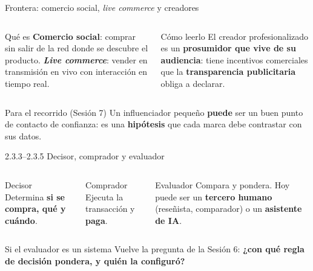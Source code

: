\documentclass[aspectratio=169,xcolor=dvipsnames]{beamer}
\begin{document}
\begin{frame}{Frontera: comercio social, \textit{live commerce} y creadores}
\begin{columns}[T]
  \begin{block}{Qué es}
    \small \textbf{Comercio social}: comprar sin salir de la red donde se descubre el producto. \textbf{\textit{Live commerce}}: vender en transmisión en vivo con interacción en tiempo real.
  \end{block}
  \begin{alertblock}{Cómo leerlo}
    \small El creador profesionalizado es un \textbf{prosumidor que vive de su audiencia}: tiene incentivos comerciales que la \textbf{transparencia publicitaria} obliga a declarar.
  \end{alertblock}
\end{columns}
\vspace{6pt}
\begin{exampleblock}{Para el recorrido (Sesión 7)}
  \small Un influenciador pequeño \textbf{puede} ser un buen punto de contacto de confianza: es una \textbf{hipótesis} que cada marca debe contrastar con sus datos.
\end{exampleblock}
\end{frame}

\begin{frame}{2.3.3--2.3.5 Decisor, comprador y evaluador}
\begin{columns}[T]
  \begin{block}{Decisor}
    \small Determina \textbf{si se compra, qué y cuándo}.
  \end{block}
  \begin{block}{Comprador}
    \small Ejecuta la transacción y \textbf{paga}.
  \end{block}
  \begin{alertblock}{Evaluador}
    \small Compara y pondera. Hoy puede ser un \textbf{tercero humano} (reseñista, comparador) o un \textbf{asistente de IA}.
  \end{alertblock}
\end{columns}
\vspace{6pt}
\begin{block}{Si el evaluador es un sistema}
  \small Vuelve la pregunta de la Sesión 6: \textbf{¿con qué regla de decisión pondera, y quién la configuró?}
\end{block}
\end{frame}
\end{document}
